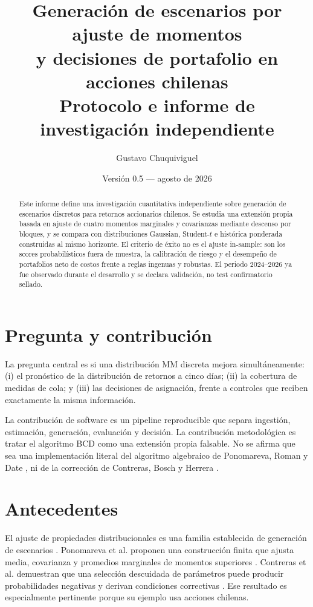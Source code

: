 \documentclass[11pt,letterpaper]{article}
\title{Generación de escenarios por ajuste de momentos\\
y decisiones de portafolio en acciones chilenas\\[0.5em]
\large Protocolo e informe de investigación independiente}
\author{Gustavo Chuquiviguel}
\date{Versión 0.5 --- agosto de 2026}
\begin{document}
\maketitle

\begin{abstract}
Este informe define una investigación cuantitativa independiente sobre generación
de escenarios discretos para retornos accionarios chilenos. Se estudia una extensión
propia basada en ajuste de cuatro momentos marginales y covarianzas mediante descenso
por bloques, y se compara con distribuciones Gaussian, Student-$t$ e histórica
ponderada construidas al mismo horizonte. El criterio de éxito no es el ajuste
in-sample: son los scores probabilísticos fuera de muestra, la calibración de riesgo
y el desempeño de portafolios neto de costos frente a reglas ingenuas y robustas.
El periodo 2024--2026 ya fue observado durante el desarrollo y se declara validación,
no test confirmatorio sellado.
\end{abstract}

\section{Pregunta y contribución}

La pregunta central es si una distribución MM discreta mejora simultáneamente:
(i) el pronóstico de la distribución de retornos a cinco días; (ii) la cobertura de
medidas de cola; y (iii) las decisiones de asignación, frente a controles que reciben
exactamente la misma información.

La contribución de software es un pipeline reproducible que separa ingestión,
estimación, generación, evaluación y decisión. La contribución metodológica es
tratar el algoritmo BCD como una extensión propia falsable. No se afirma que sea una
implementación literal del algoritmo algebraico de Ponomareva, Roman y Date
\cite{ponomareva2015}, ni de la corrección de Contreras, Bosch y Herrera
\cite{contreras2018}.

\section{Antecedentes}

El ajuste de propiedades distribucionales es una familia establecida de generación de
escenarios \cite{hoyland2001,mehrotra2013}. Ponomareva et al. proponen una construcción
finita que ajusta media, covarianza y promedios marginales de momentos superiores
\cite{ponomareva2015}. Contreras et al. demuestran que una selección descuidada de
parámetros puede producir probabilidades negativas y derivan condiciones correctivas
\cite{contreras2018}. Ese resultado es especialmente pertinente porque su ejemplo usa
acciones chilenas.
\end{document}
